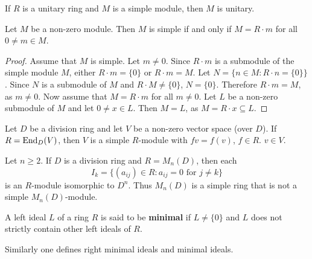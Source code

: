 If $R$ is a unitary ring and $M$ is a simple 
module, then $M$ is unitary. 


\begin{lemma}
	\label{lemma:simple}
	Let $M$ be a non-zero module. Then $M$ is simple if and only if $M=R\cdot m$
	for all $0\ne m\in M$.
\end{lemma}

\begin{proof}
	Assume that $M$ is simple.  Let $m\ne 0$. Since $R\cdot m$ is a submodule of the simple 
	module $M$, either $R\cdot m=\{0\}$ or $R\cdot m=M$.  Let $N=\{n\in M:R\cdot n=\{0\}\}$. Since $N$ is a 
	submodule of $M$ and $R\cdot M\ne\{0\}$, $N=\{0\}$. Therefore $R\cdot m=M$, as $m\ne0$.
	Now assume that $M=R\cdot m$ for all $m\ne0$. Let $L$ be a non-zero submodule of 
	$M$ and let $0\ne x\in L$. Then $M=L$, as $M=R\cdot x\subseteq L$. 
\end{proof} 

\begin{example}
	Let $D$ be a division ring and let $V$ be a non-zero vector space (over $D$). If 
	$R=\operatorname{End}_D(V)$, then $V$ is a simple $R$-module with $fv=f(v)$, $f\in R$.
	$v\in V$. 
\end{example}

\begin{example}
	\label{exa:I_k}
	Let $n\geq2$.  If $D$ is a division ring and $R=M_n(D)$, then each 
	\[
	I_k=\{ (a_{ij})\in R:a_{ij}=0\text{ for $j\ne k$}\}
	\]
	is an $R$-module isomorphic to $D^n$. 
	Thus $M_{n}(D)$ is a simple ring that is not a simple $M_n(D)$-module.
\end{example}

\begin{definition}
A left ideal $L$ of a ring $R$ is said to be \textbf{minimal} if $L\ne\{0\}$ and 
$L$ does not strictly contain other left ideals of $R$. 
\end{definition}

Similarly one defines
right minimal ideals and minimal ideals. 

